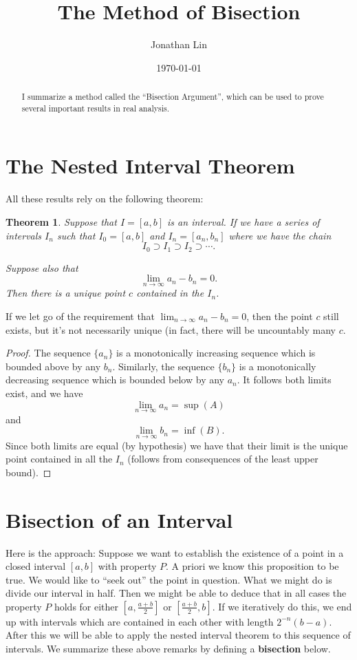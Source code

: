 \documentclass[12pt]{article}
\title{The Method of Bisection}
\date{\today}
\author{Jonathan Lin}
\theoremstyle{definition}
\theoremstyle{plain}
\newtheorem{thm}{Theorem}
\begin{document}
\maketitle
\begin{abstract}
I summarize a method called the ``Bisection Argument'', which can be used to prove several important results in real analysis.
\end{abstract}

\section{The Nested Interval Theorem}
All these results rely on the following theorem:
\begin{thm}
	Suppose that $I = [a, b]$ is an interval. If we have a series of intervals $I_n$ such that $I_0 = [a, b]$ and $I_n = [a_n, b_n]$ where we have the chain
	\[I_0 \supset I_1 \supset I_2 \supset \cdots.\]

	Suppose also that 
	\[\lim_{n \to \infty}a_n - b_n = 0.\]
	Then there is a unique point $c$ contained in the $I_n$.
\end{thm}

If we let go of the requirement that $\lim_{n \to \infty} a_n - b_n = 0$, then the point $c$ still exists, but it's not necessarily unique (in fact, there will be uncountably many $c$.

\begin{proof}
The sequence $\{a_n\}$ is a monotonically increasing sequence which is bounded above by any $b_n$. Similarly, the sequence $\{b_n\}$ is a monotonically decreasing sequence which is bounded below by any $a_n$. It follows both limits exist, and we have
\[\lim_{n \to \infty} a_n = \sup(A)\] and \[\lim_{n \to \infty}b_n = \inf(B).\] Since both limits are equal (by hypothesis) we have that their limit is the unique point contained in all the $I_n$ (follows from consequences of the least upper bound).
\end{proof}

\section{Bisection of an Interval}

Here is the approach: Suppose we want to establish the existence of a point in a closed interval $[a, b]$ with property $P$. A priori we know this proposition to be true. We would like to ``seek out'' the point in question. What we might do is divide our interval in half. Then we might be able to deduce that in all cases the property $P$ holds for either $\left[a, \frac{a + b}{2}\right]$ or $\left[\frac{a + b}{2}, b\right]$. If we iteratively do this, we end up with intervals which are contained in each other with length $2^{-n}(b-a)$. After this we will be able to apply the nested interval theorem to this sequence of intervals. We summarize these above remarks by defining a \textbf{bisection} below.
\end{document}
